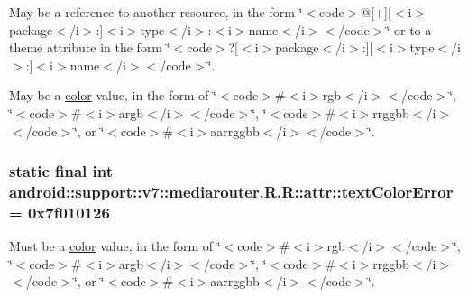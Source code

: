 May be a reference to another resource, in the form \char`\"{}$<$code$>$@\mbox{[}+\mbox{]}\mbox{[}$<$i$>$package$<$/i$>$:\mbox{]}$<$i$>$type$<$/i$>$:$<$i$>$name$<$/i$>$$<$/code$>$\char`\"{} or to a theme attribute in the form \char`\"{}$<$code$>$?\mbox{[}$<$i$>$package$<$/i$>$:\mbox{]}\mbox{[}$<$i$>$type$<$/i$>$:\mbox{]}$<$i$>$name$<$/i$>$$<$/code$>$\char`\"{}. 

May be a \hyperlink{classandroid_1_1support_1_1v7_1_1mediarouter_1_1_r_1_1color}{color} value, in the form of \char`\"{}$<$code$>$\#$<$i$>$rgb$<$/i$>$$<$/code$>$\char`\"{}, \char`\"{}$<$code$>$\#$<$i$>$argb$<$/i$>$$<$/code$>$\char`\"{}, \char`\"{}$<$code$>$\#$<$i$>$rrggbb$<$/i$>$$<$/code$>$\char`\"{}, or \char`\"{}$<$code$>$\#$<$i$>$aarrggbb$<$/i$>$$<$/code$>$\char`\"{}. \hypertarget{classandroid_1_1support_1_1v7_1_1mediarouter_1_1_r_1_1attr_45dae21a8c73587e2560610569ae229a}{
\subsubsection[{textColorError}]{\setlength{\rightskip}{0pt plus 5cm}static final int android::support::v7::mediarouter.R.R::attr::textColorError = 0x7f010126}}
\label{classandroid_1_1support_1_1v7_1_1mediarouter_1_1_r_1_1attr_45dae21a8c73587e2560610569ae229a}


Must be a \hyperlink{classandroid_1_1support_1_1v7_1_1mediarouter_1_1_r_1_1color}{color} value, in the form of \char`\"{}$<$code$>$\#$<$i$>$rgb$<$/i$>$$<$/code$>$\char`\"{}, \char`\"{}$<$code$>$\#$<$i$>$argb$<$/i$>$$<$/code$>$\char`\"{}, \char`\"{}$<$code$>$\#$<$i$>$rrggbb$<$/i$>$$<$/code$>$\char`\"{}, or \char`\"{}$<$code$>$\#$<$i$>$aarrggbb$<$/i$>$$<$/code$>$\char`\"{}. 


